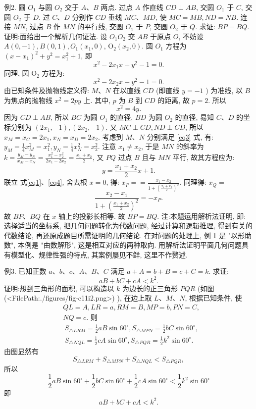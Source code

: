 例2. 圆 $O_1$ 与圆 $O_2$ 交于 $A 、 B$ 两点.
过点 $A$ 作直线 $C D \perp A B$, 交圆 $O_1$ 于 $C$, 交圆 $O_2$ 于 $D$. 过 $C 、 D$ 分别作 $C D$ 垂线 $M C 、 M D$, 使 $M C=M B, N D= N B$. 连接 $M N$, 过点 $B$ 作 $M N$ 的平行线, 交圆 $O_1$ 于 $P$, 交圆 $O_2$ 于 $Q$. 求证: $B P=B Q$.
证明:面给出一个解析几何证法.
设 $O_1 O_2$ 交 $A B$ 于原点 $O$, 不妨设 $A(0,-1), B(0,1), O_1\left(x_1, 0\right)$, $\mathrm{O}_2\left(x_2, 0\right)$.
圆 $O_1$ 方程为 $\left(x-x_1\right)^2+y^2=x_1^2+1$, 即
$$
x^2-2 x_1 x+y^2-1=0 . \label{eq1}
$$
同理, 圆 $\mathrm{O}_2$ 方程为:
$$
x^2-2 x_2 x+y^2-1=0 . \label{eq2}
$$
由已知条件及抛物线定义得: $M 、 N$ 在以直线 $C D$ (即直线 $y=-1$ ) 为准线, 以 $B$ 为焦点的抛物线 $x^2=2 p y$ 上.
其中, $p$ 为 $B$ 到 $C D$ 的距离, 故 $p=2$. 所以
$$
x^2=4 y . \label{eq3}
$$
因为 $C D \perp A B$, 所以 $B C$ 为圆 $O_1$ 的直径, $B D$ 为圆 $O_2$ 的直径, 易知 $C 、 D$ 的坐标分别为 $\left(2 x_1,-1\right),\left(2 x_2,-1\right)$.
又 $M C \perp C D, N D \perp C D$, 所以 $x_M=x_C=2 x_1, x_N=x_D=2 x_2$. 考虑到 $M 、 N$ 分别满足 \ref{eq3} 式, 有: $y_M=\frac{1}{4} x_M^2=x_1^2, y_N=\frac{1}{4} x_N^2=x_2^2$. 注意 $x_1 \neq x_2$, 于是 $M N$ 的斜率为 $k=\frac{y_M-y_N}{x_M-x_N}=\frac{x_1^2-x_2^2}{2 x_1-2 x_2}=\frac{x_1+x_2}{2}$, 又 $P Q$ 过点 $B$ 且与 $M N$ 平行, 故其方程应为:
$$
y=\frac{x_1+x_2}{2} x+1 . \label{eq4}
$$
联立 式\ref{eq1}、\ref{eq4}, 舍去根 $x=0$, 得: $x_P==\frac{x_1-x_2}{1+\left(\frac{x_1+x_2}{2}\right)^2}$. 同理得: $x_Q=$
$$
\frac{x_2-x_1}{1+\left(\frac{x_1+x_2}{2}\right)^2}=-x_P .
$$
故 $B P 、 B Q$ 在 $x$ 轴上的投影长相等.
故 $B P=B Q$.
注:本题运用解析法证明, 即: 选择适当的坐标系, 把几何问题转化为代数问题, 经过计算和逻辑推理, 得到有关的代数结论, 再还原成题目所需证明的几何结论.
在对问题的处理上, 例 1 是 "以形助数", 本例是 "由数解形", 这是相互对应的两种取向.
用解析法证明平面几何问题具有模型化、规律性强的特点, 其案例屡见不鲜, 这里不作赘述.



例3. 已知正数 $a 、 b 、 c 、 A 、 B 、 C$ 满足 $a+A=b+B=c+C=k$. 求证:
$$
a B+b C+c A<k^2 .
$$
证明:想到三角形的面积, 可以构造以 $k$ 为边长的正三角形 $P Q R$ (如图(<FilePath:./figures/fig-c11i2.png>) ), 在边上取 $L 、 M 、 N$, 根据已知条件, 使
$$
\begin{aligned}
& Q L=A, L R=a, R M=B, M P=b, P N=C, \\
& N Q=c . \text { 则 }
\end{aligned}
$$
$$
\begin{aligned}
& S_{\triangle L R M}=\frac{1}{2} a B \sin 60^{\circ}, S_{\triangle M P N}=\frac{1}{2} b C \sin 60^{\circ}, \\
& S_{\triangle N Q L}=\frac{1}{2} c A \sin 60^{\circ}, S_{\triangle P Q R}=\frac{1}{2} k^2 \sin 60^{\circ} .
\end{aligned}
$$
由图显然有
$$
S_{\triangle L R M}+S_{\triangle M P N}+S_{\triangle N Q L}<S_{\triangle P Q R},
$$
所以
$$
\frac{1}{2} a B \sin 60^{\circ}+\frac{1}{2} b C \sin 60^{\circ}+\frac{1}{2} c A \sin 60^{\circ}<\frac{1}{2} k^2 \sin 60^{\circ}
$$
即
$$
a B+b C+c A<k^2 .
$$




